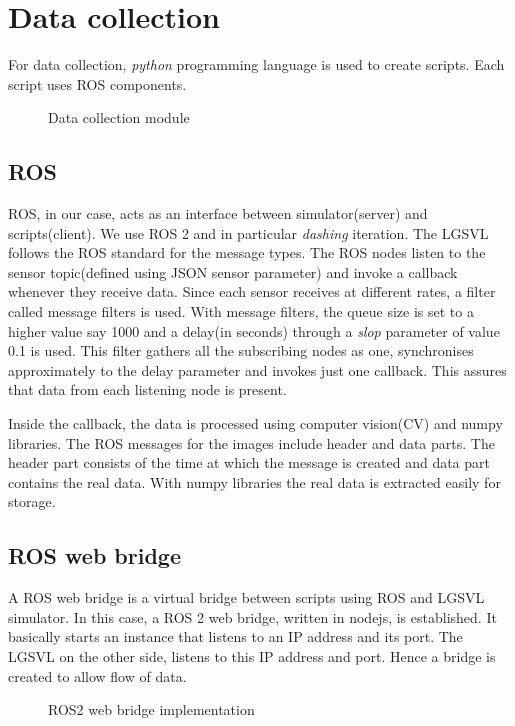 \section{Data collection}
For data collection, \textit{python} programming language is used to create scripts. Each
script uses ROS components.

\begin{figure}
	\centering
    \def\svgwidth{\textwidth}
    \caption{Data collection module}
    \label{fig:datacollectionmodule}
\end{figure}

\subsection{ROS}
ROS, in our case, acts as an interface between simulator(server) and scripts(client).
We use ROS 2 and in particular \textit{dashing} iteration. The LGSVL follows the ROS standard for the message types.
The ROS nodes listen to the sensor topic(defined using JSON sensor parameter) and invoke
a callback whenever they receive data. Since each sensor receives at different rates, a
filter called message filters is used. With message filters, the queue size is set to a
higher value say 1000 and a delay(in seconds) through a \textit{slop} parameter of value
0.1 is used. This filter gathers all the subscribing nodes as one, synchronises
approximately to the delay parameter and invokes just one callback. This assures that data
from each listening node is present.

Inside the callback, the data is processed using computer vision(CV) and numpy libraries.
The ROS messages for the images include header and data
parts. The header part consists of the time at which the message is created and data part
contains the real data. With numpy libraries the real data is extracted easily for storage.

\subsection{ROS web bridge}
A ROS web bridge is a virtual bridge between scripts using ROS and LGSVL simulator. In this
case, a ROS 2 web bridge, written in nodejs, is established. It basically starts an instance
that listens to an IP address and its port. The LGSVL on the other side, listens to this
IP address and port. Hence a bridge is created to allow flow of data.
\begin{figure}[h]
	\centering
    \def\svgwidth{\textwidth}
    \caption{ROS2 web bridge implementation}
    \label{fig:ros2webbridge}
\end{figure}
\iffalse
